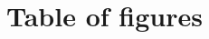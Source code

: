 \newpage{} %

\makeatletter
\renewcommand\listoffigures{%
}
\makeatother
\chapter*{Table of figures}

\listoffigures
